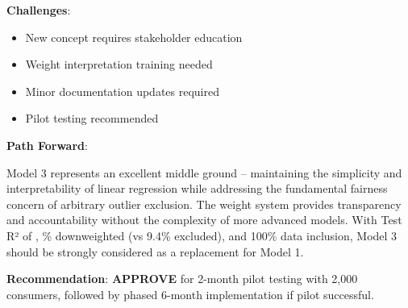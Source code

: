 \textbf{Challenges}:
\begin{itemize}
    \item New concept requires stakeholder education
    \item Weight interpretation training needed
    \item Minor documentation updates required
    \item Pilot testing recommended
\end{itemize}

\textbf{Path Forward}:

Model 3 represents an excellent middle ground -- maintaining the simplicity and interpretability of linear regression while addressing the fundamental fairness concern of arbitrary outlier exclusion. The weight system provides transparency and accountability without the complexity of more advanced models. With Test R² of \ModelThreeRSquaredTest{}, \ModelThreeOutlierPercentage{}\% downweighted (vs 9.4\% excluded), and 100\% data inclusion, Model 3 should be strongly considered as a replacement for Model 1.

\textbf{Recommendation}: \textbf{APPROVE} for 2-month pilot testing with 2,000 consumers, followed by phased 6-month implementation if pilot successful.